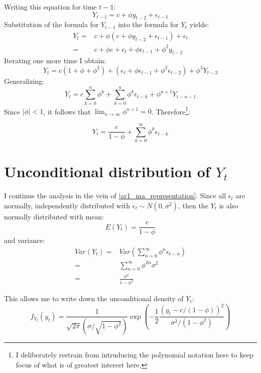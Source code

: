 \documentclass[12pt]{article}
\begin{document}
Writing this equation for time $t-1$:
\begin{equation*}
Y_{t-1} = c + \phi y_{t-2} + \epsilon_{t-1}
\end{equation*}
Substitution of the formula for $Y_{t-1}$ into the formula for $Y_t$ yields:
\begin{eqnarray*}
Y_t = & c + \phi \left(
c + \phi y_{t-2} + \epsilon_{t-1}
\right) + \epsilon_t \\
= & c + \phi c + \epsilon_t + \phi \epsilon_{t-1} + \phi^2 y_{t-2}
\end{eqnarray*}
Iterating one more time I obtain:
\begin{equation*}
Y_t =  c(1 + \phi + \phi^2) +
(\epsilon_t + \phi \epsilon_{t-1} + \phi^2 \epsilon_{t-2}) +
\phi^3 Y_{t-3}
\end{equation*}
Generalizing:
\begin{equation*}
Y_t =  c \sum_{k=0}^{n}\phi^k +
\sum_{k=0}^{n} \phi^k \epsilon_{t-k} +
\phi^{n+1} Y_{t-n-1}
\end{equation*}
Since $|\phi| < 1$, it follows that $\lim_{n \rightarrow \infty} \phi^{n+1} = 0$.
Therefore\footnote{I deliberately restrain from intruducing the polynomial notation here
to keep focus of what is of greatest interest here. }:

\begin{equation*}
\label{ar1_ma_representation}
Y_t =  \frac{c}{1 - \phi} +
\sum_{k=0}^{\infty} \phi^k \epsilon_{t-k}
\end{equation*}


\section{Unconditional distribution of $Y_t$}
I continue the analysis in the vein of \eqref{ar1_ma_representation}. Since 
all $\epsilon_t$ are normally, independently distributed with 
$\epsilon_t \sim N(0, \sigma^2)$, then the $Y_t$ is also normally distributed
with mean:
\begin{equation*}
E(Y_t) = \frac{c}{1 - \phi}
\end{equation*}
and variance:
\begin{eqnarray*}
Var(Y_t) = & Var(\sum_{n=0}^{\infty} \phi^n \epsilon_{t-n}) \\
= & \sum_{n=0}^{\infty} \phi^{2n} \sigma^2 \\
= & \frac{\sigma^2}{1 - \phi^2}
\end{eqnarray*}

This allows me to write down the unconditional density of $Y_t$:
\begin{equation}
\label{unconditional_density}
f_{Y_t}(y_t) = \frac{1}{\sqrt{2 \pi} (\sigma / \sqrt{1-\phi^2})}
\exp \left( 
- \frac{1}{2} 
\frac{(y_t - c/(1-\phi))^2}{\sigma^2/(1-\phi^2)}
\right)
\end{equation}
\end{document}
